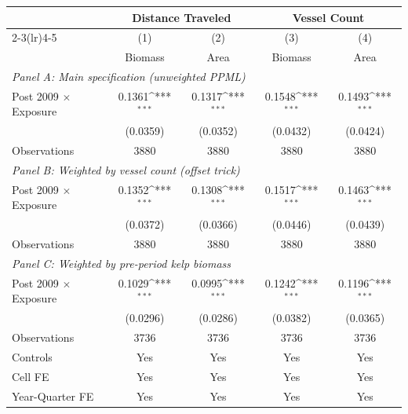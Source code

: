 \def\sym#1{\ifmmode^{#1}\else\(^{#1}\)\fi}
\begin{tabular}{l*{4}{c}}
\hline\hline
                    &\multicolumn{2}{c}{Distance Traveled}&\multicolumn{2}{c}{Vessel Count}\\
                    \cmidrule(lr){2-3}\cmidrule(lr){4-5}
                    &\multicolumn{1}{c}{(1)}&\multicolumn{1}{c}{(2)}&\multicolumn{1}{c}{(3)}&\multicolumn{1}{c}{(4)}\\
                    &\multicolumn{1}{c}{Biomass}&\multicolumn{1}{c}{Area}&\multicolumn{1}{c}{Biomass}&\multicolumn{1}{c}{Area}\\
\hline
\multicolumn{5}{l}{\textit{Panel A: Main specification (unweighted PPML)}}\\[0.3em]
Post 2009 $\times$ Exposure&     0.1361\sym{***}&     0.1317\sym{***}&     0.1548\sym{***}&     0.1493\sym{***}\\
                    &             (0.0359)&             (0.0352)&             (0.0432)&             (0.0424)\\
Observations        &        3880         &        3880         &        3880         &        3880         \\
[1em]
\multicolumn{5}{l}{\textit{Panel B: Weighted by vessel count (offset trick)}}\\[0.3em]
Post 2009 $\times$ Exposure&     0.1352\sym{***}&     0.1308\sym{***}&     0.1517\sym{***}&     0.1463\sym{***}\\
                    &             (0.0372)&             (0.0366)&             (0.0446)&             (0.0439)\\
Observations        &        3880         &        3880         &        3880         &        3880         \\
[1em]
\multicolumn{5}{l}{\textit{Panel C: Weighted by pre-period kelp biomass}}\\[0.3em]
Post 2009 $\times$ Exposure&     0.1029\sym{***}&     0.0995\sym{***}&     0.1242\sym{***}&     0.1196\sym{***}\\
                    &             (0.0296)&             (0.0286)&             (0.0382)&             (0.0365)\\
Observations        &        3736         &        3736         &        3736         &        3736         \\
Controls            &         Yes         &         Yes         &         Yes         &         Yes         \\
Cell FE             &         Yes         &         Yes         &         Yes         &         Yes         \\
Year-Quarter FE     &         Yes         &         Yes         &         Yes         &         Yes         \\
\hline\hline
\end{tabular}